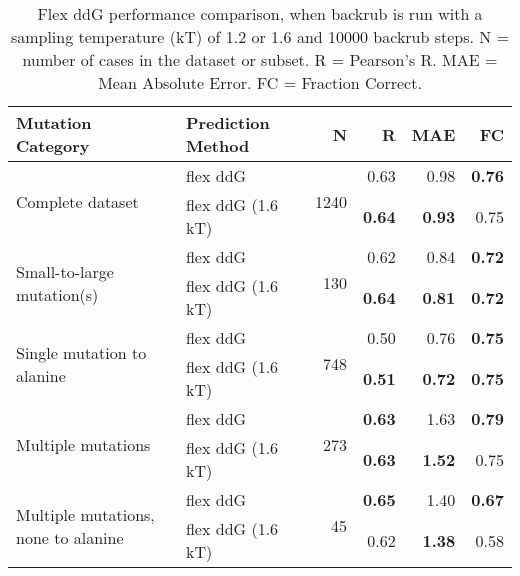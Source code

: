 \begin{table}
  \begin{tabular}{llrrrr}
\toprule
Mutation Category &  Prediction Method &     N &    R &  MAE &   FC \\
\midrule
 \multirow{ 2}{*}{Complete dataset} & flex ddG & \multirow{ 2}{*}{1240} & 0.63 & 0.98 & \textbf{0.76}  \\
 & flex ddG (1.6 kT) & & \textbf{0.64} & \textbf{0.93} & 0.75  \\
\hline
 \multirow{ 2}{*}{Small-to-large mutation(s)} & flex ddG & \multirow{ 2}{*}{130} & 0.62 & 0.84 & \textbf{0.72}  \\
 & flex ddG (1.6 kT) & & \textbf{0.64} & \textbf{0.81} & \textbf{0.72}  \\
\hline
 \multirow{ 2}{*}{Single mutation to alanine} & flex ddG & \multirow{ 2}{*}{748} & 0.50 & 0.76 & \textbf{0.75}  \\
 & flex ddG (1.6 kT) & & \textbf{0.51} & \textbf{0.72} & \textbf{0.75}  \\
\hline
 \multirow{ 2}{*}{Multiple mutations} & flex ddG & \multirow{ 2}{*}{273} & \textbf{0.63} & 1.63 & \textbf{0.79}  \\
 & flex ddG (1.6 kT) & & \textbf{0.63} & \textbf{1.52} & 0.75  \\
\hline
 \multirow{ 2}{*}{Multiple mutations, none to alanine} & flex ddG & \multirow{ 2}{*}{45} & \textbf{0.65} & 1.40 & \textbf{0.67}  \\
 & flex ddG (1.6 kT) & & 0.62 & \textbf{1.38} & 0.58  \\
\bottomrule
\end{tabular}
  \caption[Comparison of backrub temperature results]{
    Flex ddG performance comparison, when backrub is run with a sampling temperature (kT) of 1.2 or 1.6 and 10000 backrub steps. N = number of cases in the dataset or subset. R = Pearson's R. MAE = Mean Absolute Error. FC = Fraction Correct.
  } \label{tab:table-temperature}
\end{table}
